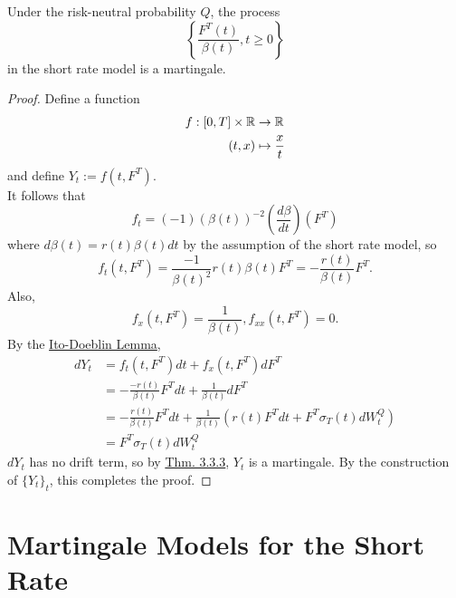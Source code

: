 \documentclass[11pt,fleqn]{book} %
\begin{document}
\begin{corollary} \label{cor:5211}
Under the risk-neutral probability \(Q\), the process
\[
\left\{\frac{F^T(t)}{\beta(t)}, t \geq 0\right\}
\]
in the short rate model is a martingale.
\end{corollary}
\begin{proof}
Define a function
\[
\begin{aligned}
f:[0, T] \times \mathbb{R} &\rightarrow \mathbb{R} \\
(t, x) &\mapsto \frac{x}{t}
\end{aligned}
\]
and define \(Y_t := f(t, F^T)\). \\
\indent It follows that
\[
f_t = (-1)(\beta(t))^{-2}\left(\frac{d\beta}{dt}\right)(F^T)
\]
where \(d\beta(t) = r(t)\beta(t)dt\) by the assumption of the short rate model, so
\[
f_t(t, F^T) = \frac{-1}{\beta(t)^2}r(t)\beta(t)F^T = -\frac{r(t)}{\beta(t)}F^T.
\]
\indent Also,
\[
f_x(t, F^T) = \frac{1}{\beta(t)}, f_{xx}(t, F^T) = 0.
\]
\indent By the \hyperref[thm:339]{Ito-Doeblin Lemma}, 
\[
\begin{aligned}
dY_t &= f_t(t, F^T)dt + f_x(t, F^T)dF^T \\
&= -\frac{-r(t)}{\beta(t)}F^Tdt + \frac{1}{\beta(t)}dF^T \\
&= -\frac{r(t)}{\beta(t)}F^Tdt + \frac{1}{\beta(t)}(r(t)F^Tdt + F^T\sigma_T(t)dW_t^Q) \\
&= F^T\sigma_T(t)dW_t^Q
\end{aligned}
\]
\indent \(dY_t\) has no drift term, so by \hyperref[thm:333]{Thm. 3.3.3}, \(Y_t\) is a martingale. By the construction of \(\{Y_t\}_t\), this completes the proof.
\end{proof}


\section{Martingale Models for the Short Rate}
\end{document}
